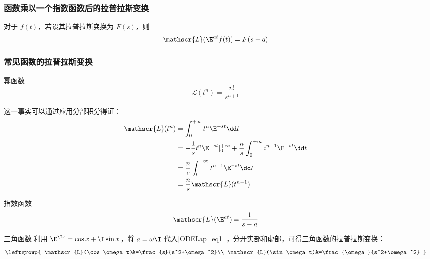 \subsubsection{函数乘以一个指数函数后的拉普拉斯变换}




\begin{theorem}{}\label{ODELap_the2}
对于 $f(t)$，若设其拉普拉斯变换为 $F(s)$，则
\begin{equation}
\mathscr{L}(\E^{at}f(t))=F(s-a)
\end{equation}
\end{theorem}









\subsubsection{常见函数的拉普拉斯变换}

\begin{example}{幂函数}
\begin{equation}\label{ODELap_eq11}
\mathscr{L}(t^n)=\frac{n!}{s^{n+1}}
\end{equation}

这一事实可以通过应用分部积分得证：
\begin{equation}\label{ODELap_eq2}
\begin{aligned}
\mathscr{L}(t^n)&=\int_0^{+\infty}t^n\E^{-st}\dd t\\
&=-\frac{1}{s}t^n\E^{-st}|^{+\infty}_0+\frac{n}{s}\int_0^{+\infty}t^{n-1}\E^{-st}\dd t\\
&=\frac{n}{s}\int_0^{+\infty}t^{n-1}\E^{-st}\dd t\\
&=\frac{n}{s}\mathscr{L}(t^{n-1})
\end{aligned}
\end{equation}
\end{example}

\begin{example}{指数函数}
\begin{equation}\label{ODELap_eq1}
\mathscr{L}(\E^{at})=\frac{1}{s-a}
\end{equation}

\end{example}

\begin{example}{三角函数}
利用 $\E^{\I x}=\cos x+\I\sin x$，将 $a=\omega\I$ 代入\autoref{ODELap_eq1} ，分开实部和虚部，可得三角函数的拉普拉斯变换：
\begin{equation}\label{ODELap_eq3}
\leftgroup{
    \mathscr{L}(\cos \omega t)&=\frac{s}{s^2+\omega^2}\\
    \mathscr{L}(\sin \omega t)&=\frac{\omega}{s^2+\omega^2}
}
\end{equation}
\end{example}


